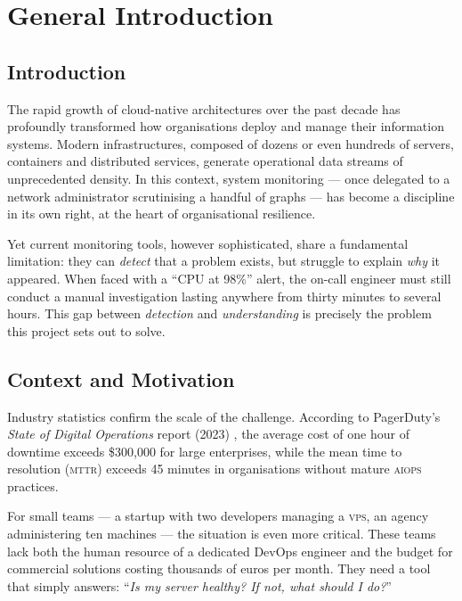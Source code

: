 \chapter{General Introduction}

\section*{Introduction}

The rapid growth of cloud-native architectures over the past decade has profoundly
transformed how organisations deploy and manage their information systems. Modern
infrastructures, composed of dozens or even hundreds of servers, containers and
distributed services, generate operational data streams of unprecedented density.
In this context, system monitoring — once delegated to a network administrator
scrutinising a handful of graphs — has become a discipline in its own right, at
the heart of organisational resilience.

Yet current monitoring tools, however sophisticated, share a fundamental
limitation: they can \textit{detect} that a problem exists, but struggle to
explain \textit{why} it appeared. When faced with a ``CPU at 98\%'' alert, the
on-call engineer must still conduct a manual investigation lasting anywhere from
thirty minutes to several hours. This gap between \textit{detection} and
\textit{understanding} is precisely the problem this project sets out to solve.

\section{Context and Motivation}

Industry statistics confirm the scale of the challenge. According to PagerDuty's
\textit{State of Digital Operations} report (2023) \cite{pagerduty2023}, the
average cost of one hour of downtime exceeds \$300,000 for large enterprises,
while the mean time to resolution (\textsc{mttr}) exceeds 45 minutes in
organisations without mature \textsc{aiops} practices.

For small teams — a startup with two developers managing a \textsc{vps}, an
agency administering ten machines — the situation is even more critical. These
teams lack both the human resource of a dedicated DevOps engineer and the budget
for commercial solutions costing thousands of euros per month. They need a tool
that simply answers: ``\textit{Is my server healthy? If not, what should I do?}''

